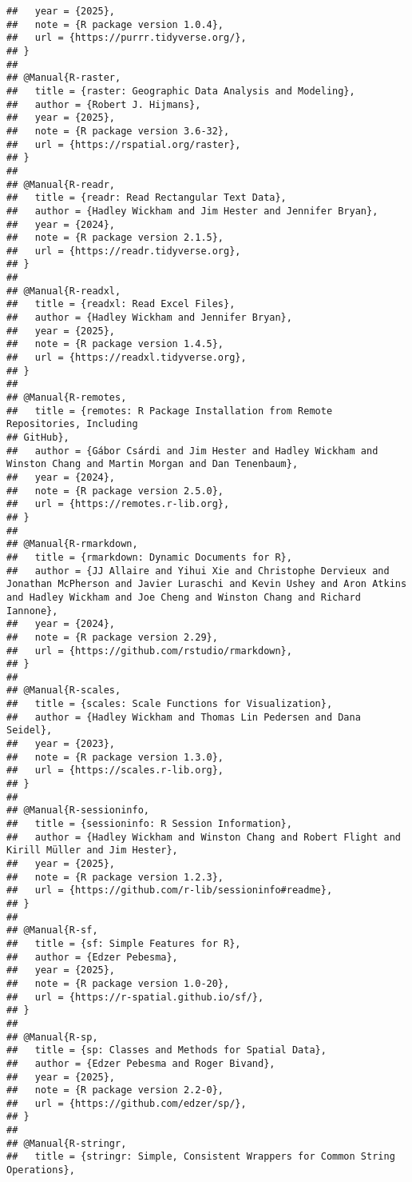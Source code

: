 \documentclass[
]{article}
\begin{document}
\begin{verbatim}
##   year = {2025},
##   note = {R package version 1.0.4},
##   url = {https://purrr.tidyverse.org/},
## }
## 
## @Manual{R-raster,
##   title = {raster: Geographic Data Analysis and Modeling},
##   author = {Robert J. Hijmans},
##   year = {2025},
##   note = {R package version 3.6-32},
##   url = {https://rspatial.org/raster},
## }
## 
## @Manual{R-readr,
##   title = {readr: Read Rectangular Text Data},
##   author = {Hadley Wickham and Jim Hester and Jennifer Bryan},
##   year = {2024},
##   note = {R package version 2.1.5},
##   url = {https://readr.tidyverse.org},
## }
## 
## @Manual{R-readxl,
##   title = {readxl: Read Excel Files},
##   author = {Hadley Wickham and Jennifer Bryan},
##   year = {2025},
##   note = {R package version 1.4.5},
##   url = {https://readxl.tidyverse.org},
## }
## 
## @Manual{R-remotes,
##   title = {remotes: R Package Installation from Remote Repositories, Including
## GitHub},
##   author = {Gábor Csárdi and Jim Hester and Hadley Wickham and Winston Chang and Martin Morgan and Dan Tenenbaum},
##   year = {2024},
##   note = {R package version 2.5.0},
##   url = {https://remotes.r-lib.org},
## }
## 
## @Manual{R-rmarkdown,
##   title = {rmarkdown: Dynamic Documents for R},
##   author = {JJ Allaire and Yihui Xie and Christophe Dervieux and Jonathan McPherson and Javier Luraschi and Kevin Ushey and Aron Atkins and Hadley Wickham and Joe Cheng and Winston Chang and Richard Iannone},
##   year = {2024},
##   note = {R package version 2.29},
##   url = {https://github.com/rstudio/rmarkdown},
## }
## 
## @Manual{R-scales,
##   title = {scales: Scale Functions for Visualization},
##   author = {Hadley Wickham and Thomas Lin Pedersen and Dana Seidel},
##   year = {2023},
##   note = {R package version 1.3.0},
##   url = {https://scales.r-lib.org},
## }
## 
## @Manual{R-sessioninfo,
##   title = {sessioninfo: R Session Information},
##   author = {Hadley Wickham and Winston Chang and Robert Flight and Kirill Müller and Jim Hester},
##   year = {2025},
##   note = {R package version 1.2.3},
##   url = {https://github.com/r-lib/sessioninfo#readme},
## }
## 
## @Manual{R-sf,
##   title = {sf: Simple Features for R},
##   author = {Edzer Pebesma},
##   year = {2025},
##   note = {R package version 1.0-20},
##   url = {https://r-spatial.github.io/sf/},
## }
## 
## @Manual{R-sp,
##   title = {sp: Classes and Methods for Spatial Data},
##   author = {Edzer Pebesma and Roger Bivand},
##   year = {2025},
##   note = {R package version 2.2-0},
##   url = {https://github.com/edzer/sp/},
## }
## 
## @Manual{R-stringr,
##   title = {stringr: Simple, Consistent Wrappers for Common String Operations},

\end{verbatim}
\end{document}
